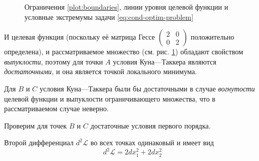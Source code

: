 \documentclass{article}
\providecommand{\La}{\mathcal{L}}
\theoremstyle{remark}
\theoremstyle{definition}
\numberwithin{equation}{section}
\begin{document}
\begin{figure}[!h]
  \centering
  \caption{Ограничения \ref{plot:boundaries}, линии уровня целевой
    функции и условные экстремумы задачи
    \eqref{eq:cond-optim-problem}}
  \label{fig:cond-optim}
\end{figure}

И целевая функция (поскольку её матрица Гессе
$\left( \begin{smallmatrix}2 & 0 \\ 0 & 2\end{smallmatrix} \right)$
положительно определена), и рассматриваемое множество (см. рис.
\ref{fig:cond-optim}) обладают свойством \emph{выпуклости}, поэтому
для точки $A$ условия Куна—Таккера являются \emph{достаточными}, и она
является точкой локального минимума.

Для $B$ и $C$ условия Куна—Таккера были бы достаточными в случае
\emph{вогнутости} целевой функции и выпуклости ограничивающего
множества, что в рассматриваемом случае неверно.

Проверим для точек $B$ и $C$ достаточные условия первого порядка.

Второй дифференциал $d^2\La$ во всех точках одинаковый и имеет вид
\begin{equation}
  \label{eq:la-diff}
  d^2\La = 2dx_1^2 + 2 dx_2^2
\end{equation}
\end{document}
